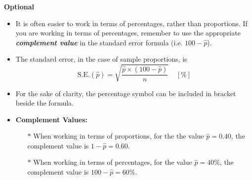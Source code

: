 \documentclass[a4paper,12pt]{article}
\begin{document}
\newpage
\noindent \textbf{Optional}
\begin{itemize}

\item It is often easier to work in terms of percentages, rather than proportions.
If you are working in terms of percentages, remember to use the appropriate \textbf{\textit{complement value}} in the standard error formula (i.e. $100 - \hat{p}$). 

\item The standard error, in the case of sample proportions, is
\[ \mbox{S.E.}(\hat{p}) = \sqrt{\frac{\hat{p}\times (100-\hat{p})}{n}} \;\;\;\; [\%]\]
\item For the sake of clarity, the percentage symbol can be included in bracket beside the formula.
\item \textbf{Complement Values:}
\begin{itemize} \item[$\ast$] When working in terms of proportions, for the the value $\hat{p} =0.40$, the complement value is $1-\hat{p} =0.60$.
\item[$\ast$] When working in terms of percentages, for the value $\hat{p} = 40\%$, the complement value is $100-\hat{p} = 60\%$.
\end{itemize}
\end{itemize}
\end{document}
